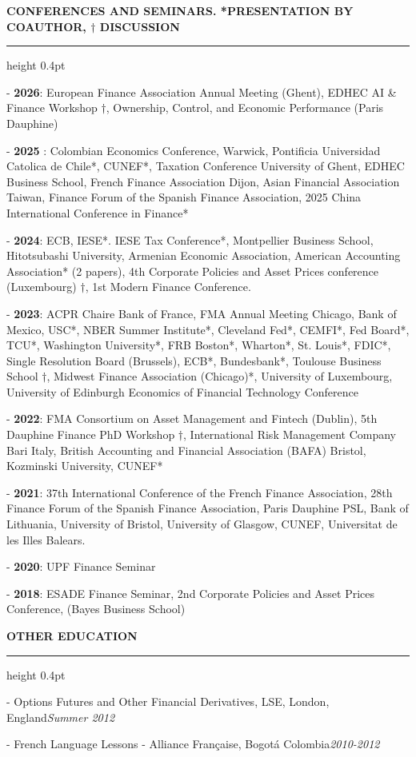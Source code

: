 \documentclass[11pt,letterpaper]{article}
\makeatletter
\newcommand{\cvsection}[1]{%
  \par\vspace{12.80pt}%
  \textbf{#1}\par\nobreak
  \vspace{6.08pt}\hrule height 0.4pt\nobreak\vspace{6.9pt}\nobreak}
\newenvironment{cvbody}
  {\begin{list}{}{%
      \@beginparpenalty\@M      %
      \setlength{\leftmargin}{1.5em}%
      \setlength{\rightmargin}{0pt}%
      \setlength{\labelwidth}{0pt}%
      \setlength{\labelsep}{0pt}%
      \setlength{\listparindent}{0pt}%
      \setlength{\itemindent}{0pt}%
      \setlength{\topsep}{0pt}%
      \setlength{\partopsep}{0pt}%
      \setlength{\parsep}{0pt}%
      \setlength{\itemsep}{0pt}}%
   \item\relax}
  {\end{list}}
\newcommand{\dated}[2]{#1\hfill\textit{#2}\par}
\makeatother
\begin{document}
\cvsection{CONFERENCES AND SEMINARS. *PRESENTATION BY COAUTHOR, $\dagger$ DISCUSSION}
\begin{cvbody}
- \textbf{2026}: European Finance Association Annual Meeting (Ghent), EDHEC AI \& Finance Workshop $\dagger$, Ownership, Control, and Economic Performance (Paris Dauphine)\par
- \textbf{2025} : Colombian Economics Conference, Warwick, Pontificia Universidad Catolica de Chile*, CUNEF*, Taxation Conference University of Ghent, EDHEC Business School, French Finance Association Dijon, Asian Financial Association Taiwan, Finance Forum of the Spanish Finance Association, 2025 China International Conference in Finance*\par
- \textbf{2024}: ECB, IESE*. IESE Tax Conference*, Montpellier Business School, Hitotsubashi University, Armenian Economic Association, American Accounting Association* (2 papers), 4th Corporate Policies and Asset Prices conference (Luxembourg) $\dagger$, 1st Modern Finance Conference.\par
- \textbf{2023}: ACPR Chaire Bank of France, FMA Annual Meeting Chicago, Bank of Mexico, USC*, NBER Summer Institute*, Cleveland Fed*, CEMFI*, Fed Board*, TCU*, Washington University*, FRB Boston*, Wharton*, St. Louis*, FDIC*, Single Resolution Board (Brussels), ECB*, Bundesbank*, Toulouse Business School $\dagger$, Midwest Finance Association (Chicago)*, University of Luxembourg, University of Edinburgh Economics of Financial Technology Conference\par
- \textbf{2022}: FMA Consortium on Asset Management and Fintech (Dublin), 5th Dauphine Finance PhD Workshop $\dagger$, International Risk Management Company Bari Italy, British Accounting and Financial Association (BAFA) Bristol, Kozminski University, CUNEF*\par
- \textbf{2021}: 37th International Conference of the French Finance Association, 28th Finance Forum of the Spanish Finance Association, Paris Dauphine PSL, Bank of Lithuania, University of Bristol, University of Glasgow, CUNEF, Universitat de les Illes Balears.\par
- \textbf{2020}: UPF Finance Seminar\par
- \textbf{2018}: ESADE Finance Seminar, 2nd Corporate Policies and Asset Prices Conference, (Bayes Business School)\par
\end{cvbody}

\cvsection{OTHER EDUCATION}
\begin{cvbody}
\dated{- Options Futures and Other Financial Derivatives, LSE, London, England}{Summer 2012}
\dated{- French Language Lessons - Alliance Française, Bogotá Colombia}{2010-2012}
\end{cvbody}
\end{document}
